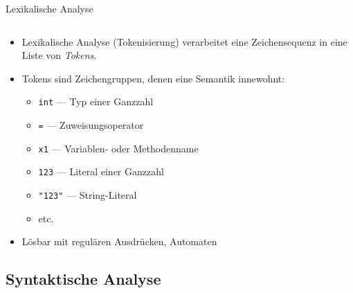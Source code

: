 \documentclass{beamer}
\newcommand{\code}[1]{
	\begin{mdframed}
		
	\end{mdframed}
}
\begin{document}
\begin{frame}{Lexikalische Analyse}
	\begin{columns}
		\begin{column}{0.5\textwidth}
			\code{code/lexinput.java}
		\end{column}
		\begin{column}{0.5\textwidth}
			\code{code/lexoutput.java}
		\end{column}
	\end{columns}

	\begin{itemize}
		\item Lexikalische Analyse (Tokenisierung) verarbeitet eine Zeichensequenz in eine Liste von \emph{Tokens}.
		\item Tokens sind Zeichengruppen, denen eine Semantik innewohnt:
		\begin{itemize}
			\item \texttt{int} --- Typ einer Ganzzahl
			\item \texttt{=} --- Zuweisungsoperator
			\item \texttt{x1} --- Variablen- oder Methodenname
			\item \texttt{123} --- Literal einer Ganzzahl
			\item \texttt{"123"} --- String-Literal
			\item etc.
		\end{itemize}
		\item Lösbar mit regulären Ausdrücken, Automaten
	\end{itemize}
\end{frame}

\subsection{Syntaktische Analyse}
\end{document}
